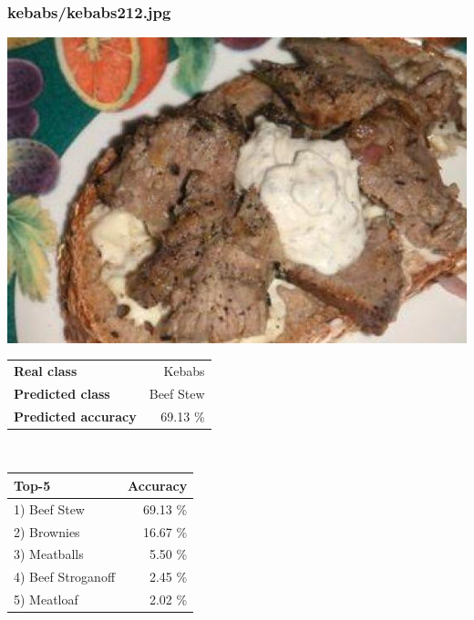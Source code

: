\subsubsection{kebabs/kebabs212.jpg}

\begin{minipage}[t]{0.4\textwidth}
	\vspace{0pt}
	\includegraphics[width=\linewidth]{images/evaluation-images/kebabs/kebabs212.jpg}
\end{minipage}
\hfill
\begin{minipage}[t]{0.5\textwidth}
	\vspace{0pt}\raggedright
	\begin{tabularx}{\textwidth}{X r}
		\small \textbf{Real class} & \small Kebabs\\
		\small \textbf{Predicted class} & \small Beef Stew\\
		\small \textbf{Predicted accuracy} & \small 69.13 \%
    \end{tabularx}\\
    
    \vspace{6pt}
	\begin{tabularx}{\textwidth}{X r}
        \small \textbf{Top-5} & \small \textbf{Accuracy} \\
        \hline
		\small 1) Beef Stew & \small 69.13 \%\\\small 2) Brownies & \small 16.67 \%\\\small 3) Meatballs & \small 5.50 \%\\\small 4) Beef Stroganoff & \small 2.45 \%\\\small 5) Meatloaf & \small 2.02 \%
    \end{tabularx}
\end{minipage}
    
